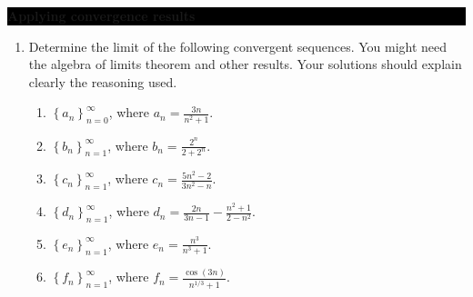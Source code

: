 \documentclass[oneside,10pt]{amsart}
\newcommand{\cbox}[1]{\colorbox{black}{\begin{minipage}{\linewidth}\color{white}\sffamily #1 \end{minipage}}}
\newcommand{\topic}[1]{\cbox{\textbf{#1}}}
\newcounter{pass}
\newif\ifshowanswers
\newcommand{\solution}[1]{\ifshowanswers{\newline\colorbox{black!20}{\begin{minipage}{\linewidth}\color{black}{#1}\end{minipage}}
}\else\fi}
\begin{document}
\topic{Applying convergence results}
\begin{enumerate}
\setcounter{enumi}{\value{pass}}
\item
Determine the limit of the following convergent sequences. You might need the algebra of limits theorem and other results. Your solutions should explain clearly the reasoning used.
\solution{Parts (a) - (e) can be solved by applying the algebra of limits theorem. The proofs are summarised below but should be supplemented with some commentary as well.}
    \begin{enumerate} 
    \item
    $\left \{ a_n \right \}_{n=0}^\infty$, where $a_n = \frac{3n}{n^2 + 1}$.
    \solution{
    $$\lim_{n \to \infty} a_n = \lim_{n \to \infty} \frac{3/n}{1+1/n^2} = \frac{0}{1+0} = 0.$$}
    \item
    $\left \{ b_n \right \}_{n=1}^\infty$, where $b_n = \frac{2^n}{2+2^n}$.
    \solution{
    $$\lim_{n \to \infty} b_n = \lim_{n \to \infty} \frac{1}{1/2^{n-1}+1} = \frac{1}{0+1} = 1.$$}
    \item
    $\left \{ c_n \right \}_{n=1}^\infty$, where $c_n = \frac{5n^2 - 2}{3n^2 - n}$.
    \solution{
    $$\lim_{n \to \infty} c_n = \lim_{n \to \infty} \frac{5 - 2/n^2}{3 - 1/n} = \frac{5 - 0}{3 - 0} = 5/3.$$}
    \item
    $\left \{ d_n \right \}_{n=1}^\infty$, where $d_n = \frac{2n}{3n - 1} - \frac{n^2 + 1}{2 - n^2}$.
    \solution{
    $$\lim_{n \to \infty} d_n = \lim_{n \to \infty} \left ( \frac{2}{3 - 1/n} \right ) - \lim_{n\to \infty} \left ( \frac{1 + 1/n^2}{2/n^2 - 1} \right )= \frac{2}{3 - 0} - \frac{1+0}{0 -1}= 5/3.$$}
    \item
    $\left \{ e_n \right \}_{n=1}^\infty$, where $e_n = \frac{n^3}{n^3 + 1}$.
    \solution{
    $$\lim_{n \to \infty} e_n = \lim_{n \to \infty} \frac{1}{1+1/n^3} = \frac{1}{1+0} = 1.$$}
    \item
    $\left \{ f_n \right \}_{n=1}^\infty$, where $f_n = \frac{\cos{(3n)}}{n^{1/3}     + 1}$.
    \solution{
    This questions requires the use of the Squeeze Theorem (not in the notes, but I will present it in the lectures) First we use the boundedness of the cosine function to say
    $$\frac{-1}{n^{1/3} +1} \leq f_n \leq \frac{1}{n^{1/3} +1}.$$
    Then we notice that the sequences at the ends of this inequality both coverge to zero as the denominators are increasing and unbounded. Therefore by the Squeeze Theorem $f_n \to 0$ as $n \to \infty$.
    }
    \end{enumerate}

\end{enumerate}
\end{document}
